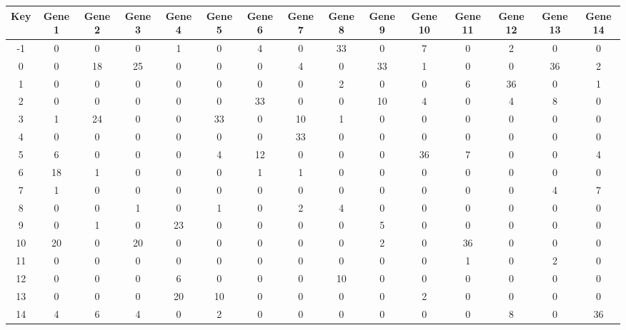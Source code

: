 \begin{tabular}{|c|c|c|c|c|c|c|c|c|c|c|c|c|c|c|}
\hline
Key & Gene 1 & Gene 2 & Gene 3 & Gene 4 & Gene 5 & Gene 6 & Gene 7 & Gene 8 & Gene 9 & Gene 10 & Gene 11 & Gene 12 & Gene 13 & Gene 14 \\
\hline
-1 & 0 & 0 & 0 & 1 & 0 & 4 & 0 & 33 & 0 & 7 & 0 & 2 & 0 & 0 \\
0 & 0 & 18 & 25 & 0 & 0 & 0 & 4 & 0 & 33 & 1 & 0 & 0 & 36 & 2 \\
1 & 0 & 0 & 0 & 0 & 0 & 0 & 0 & 2 & 0 & 0 & 6 & 36 & 0 & 1 \\
2 & 0 & 0 & 0 & 0 & 0 & 33 & 0 & 0 & 10 & 4 & 0 & 4 & 8 & 0 \\
3 & 1 & 24 & 0 & 0 & 33 & 0 & 10 & 1 & 0 & 0 & 0 & 0 & 0 & 0 \\
4 & 0 & 0 & 0 & 0 & 0 & 0 & 33 & 0 & 0 & 0 & 0 & 0 & 0 & 0 \\
5 & 6 & 0 & 0 & 0 & 4 & 12 & 0 & 0 & 0 & 36 & 7 & 0 & 0 & 4 \\
6 & 18 & 1 & 0 & 0 & 0 & 1 & 1 & 0 & 0 & 0 & 0 & 0 & 0 & 0 \\
7 & 1 & 0 & 0 & 0 & 0 & 0 & 0 & 0 & 0 & 0 & 0 & 0 & 4 & 7 \\
8 & 0 & 0 & 1 & 0 & 1 & 0 & 2 & 4 & 0 & 0 & 0 & 0 & 0 & 0 \\
9 & 0 & 1 & 0 & 23 & 0 & 0 & 0 & 0 & 5 & 0 & 0 & 0 & 0 & 0 \\
10 & 20 & 0 & 20 & 0 & 0 & 0 & 0 & 0 & 2 & 0 & 36 & 0 & 0 & 0 \\
11 & 0 & 0 & 0 & 0 & 0 & 0 & 0 & 0 & 0 & 0 & 1 & 0 & 2 & 0 \\
12 & 0 & 0 & 0 & 6 & 0 & 0 & 0 & 10 & 0 & 0 & 0 & 0 & 0 & 0 \\
13 & 0 & 0 & 0 & 20 & 10 & 0 & 0 & 0 & 0 & 2 & 0 & 0 & 0 & 0 \\
14 & 4 & 6 & 4 & 0 & 2 & 0 & 0 & 0 & 0 & 0 & 0 & 8 & 0 & 36 \\
\hline
\end{tabular}